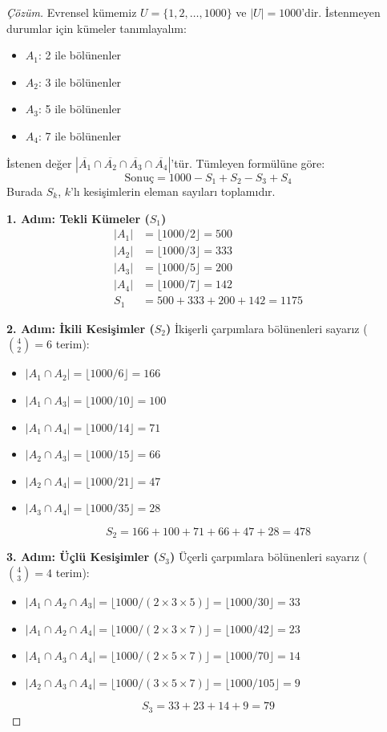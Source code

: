 \begin{proof}[Çözüm]
Evrensel kümemiz $U = \{1, 2, \dots, 1000\}$ ve $|U| = 1000$'dir. İstenmeyen
durumlar için kümeler tanımlayalım: \begin{itemize} \item $A_1$: 2 ile bölünenler
\item $A_2$: 3 ile bölünenler \item $A_3$: 5 ile bölünenler \item $A_4$: 7 ile
bölünenler \end{itemize} İstenen değer $|\overline{A_1} \cap \overline{A_2} \cap
\overline{A_3} \cap \overline{A_4}|$'tür. Tümleyen formülüne göre: \[ \text{Sonuç}
= 1000 - S_1 + S_2 - S_3 + S_4 \] Burada $S_k$, $k$'lı kesişimlerin eleman
sayıları toplamıdır.

\textbf{1. Adım: Tekli Kümeler ($S_1$)} \begin{align*} |A_1| &= \lfloor 1000 / 2
\rfloor = 500 \\ |A_2| &= \lfloor 1000 / 3 \rfloor = 333 \\ |A_3| &= \lfloor 1000
/ 5 \rfloor = 200 \\ |A_4| &= \lfloor 1000 / 7 \rfloor = 142 \\ S_1 &= 500 + 333
+ 200 + 142 = 1175 \end{align*}

\textbf{2. Adım: İkili Kesişimler ($S_2$)} İkişerli çarpımlara bölünenleri sayarız
($\binom{4}{2} = 6$ terim): \begin{itemize} \item
$|A_1 \cap A_2| = \lfloor 1000 / 6 \rfloor = 166$ \item
$|A_1 \cap A_3| = \lfloor 1000 / 10 \rfloor = 100$ \item
$|A_1 \cap A_4| = \lfloor 1000 / 14 \rfloor = 71$ \item
$|A_2 \cap A_3| = \lfloor 1000 / 15 \rfloor = 66$ \item
$|A_2 \cap A_4| = \lfloor 1000 / 21 \rfloor = 47$ \item
$|A_3 \cap A_4| = \lfloor 1000 / 35 \rfloor = 28$ \end{itemize} \[ S_2 = 166 + 100
+ 71 + 66 + 47 + 28 = 478 \]

\textbf{3. Adım: Üçlü Kesişimler ($S_3$)} Üçerli çarpımlara bölünenleri sayarız
($\binom{4}{3} = 4$ terim): \begin{itemize} \item
$|A_1 \cap A_2 \cap A_3| = \lfloor 1000 / (2 \times 3 \times 5) \rfloor = \lfloor 1000 / 30 \rfloor = 33$
\item
$|A_1 \cap A_2 \cap A_4| = \lfloor 1000 / (2 \times 3 \times 7) \rfloor = \lfloor 1000 / 42 \rfloor = 23$
\item
$|A_1 \cap A_3 \cap A_4| = \lfloor 1000 / (2 \times 5 \times 7) \rfloor = \lfloor 1000 / 70 \rfloor = 14$
\item
$|A_2 \cap A_3 \cap A_4| = \lfloor 1000 / (3 \times 5 \times 7) \rfloor = \lfloor 1000 / 105 \rfloor = 9$
\end{itemize} \[ S_3 = 33 + 23 + 14 + 9 = 79 \]


\end{proof}
